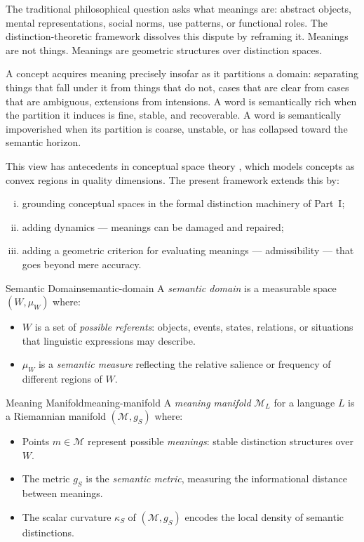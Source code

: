 \documentclass[12pt,twoside,openright]{book}
\begin{document}
The traditional philosophical question asks what meanings
are: abstract objects, mental representations, social
norms, use patterns, or functional roles.
The distinction-theoretic framework dissolves this
dispute by reframing it.
Meanings are not things. Meanings are geometric
structures over distinction spaces.

A concept acquires meaning precisely insofar as it
partitions a domain: separating things that fall under
it from things that do not, cases that are clear from
cases that are ambiguous, extensions from intensions.
A word is semantically rich when the partition it
induces is fine, stable, and recoverable.
A word is semantically impoverished when its partition
is coarse, unstable, or has collapsed toward the
semantic horizon.

This view has antecedents in conceptual space theory
\parencite{gardenfors2000conceptual}, which models
concepts as convex regions in quality dimensions.
The present framework extends this by:
\begin{enumerate}[(i)]
  \item grounding conceptual spaces in the formal
        distinction machinery of Part~I;
  \item adding dynamics — meanings can be damaged and
        repaired;
  \item adding a geometric criterion for evaluating
        meanings — admissibility — that goes beyond
        mere accuracy.
\end{enumerate}

\begin{definition}{Semantic Domain}{semantic-domain}
  A \emph{semantic domain} is a measurable space
  $(W, \mu_W)$ where:
  \begin{itemize}[nosep]
    \item $W$ is a set of \emph{possible referents}:
          objects, events, states, relations, or
          situations that linguistic expressions
          may describe.
    \item $\mu_W$ is a \emph{semantic measure}
          reflecting the relative salience or
          frequency of different regions of $W$.
  \end{itemize}
\end{definition}

\begin{definition}{Meaning Manifold}{meaning-manifold}
  A \emph{meaning manifold} $\mathcal{M}_L$ for a
  language $L$ is a Riemannian manifold
  $(\mathcal{M}, g_S)$ where:
  \begin{itemize}[nosep]
    \item Points $m \in \mathcal{M}$ represent possible
          \emph{meanings}: stable distinction structures
          over $W$.
    \item The metric $g_S$ is the \emph{semantic metric},
          measuring the informational distance between
          meanings.
    \item The scalar curvature $\kappa_S$ of
          $(\mathcal{M}, g_S)$ encodes the local
          density of semantic distinctions.
  \end{itemize}
\end{definition}
\end{document}
